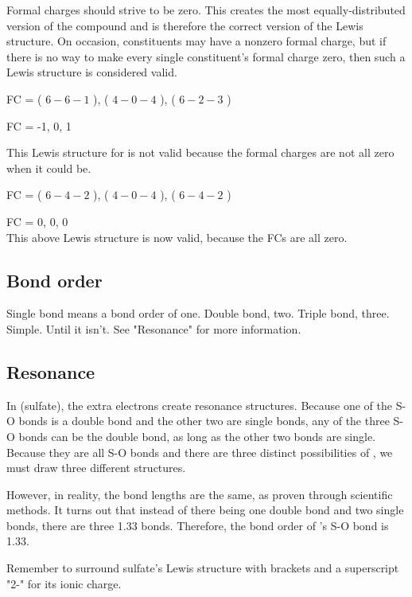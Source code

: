 \documentclass[letterpaper, 12pt]{article}
\begin{document}
	Formal charges should strive to be zero. This creates the most equally-distributed version of the compound and is therefore the correct version of the Lewis structure. On occasion, constituents may have a nonzero formal charge, but if there is no way to make every single constituent's formal charge zero, then such a Lewis structure is considered valid.\\


	FC = ( $6 - 6 - 1$ ), ( $4 - 0 - 4$ ), ( $6 - 2 - 3$ )

	FC = -1, 0, 1

	This Lewis structure for  is not valid because the formal charges are not all zero when it could be.\\


	FC = ( $6 - 4 - 2$ ), ( $4 - 0 - 4$ ), ( $6 - 4 - 2$ )

	FC = 0, 0, 0\\

	This above Lewis structure is now valid, because the FCs are all zero.

	\subsection{Bond order}
	Single bond means a bond order of one. Double bond, two. Triple bond, three. Simple. Until it isn't. See "Resonance" for more information.

	\subsection{Resonance}
	In  (sulfate), the extra electrons create resonance structures. Because one of the S-O bonds is a double bond and the other two are single bonds, any of the three S-O bonds can be the double bond, as long as the other two bonds are single. Because they are all S-O bonds and there are three distinct possibilities of , we must draw three different structures.

	However, in reality, the  bond lengths are the same, as proven through scientific methods. It turns out that instead of there being one double bond and two single bonds, there are three 1.33 bonds. Therefore, the bond order of 's S-O bond is 1.33.

	Remember to surround sulfate's Lewis structure with brackets and a superscript "2-" for its ionic charge.
\end{document}
